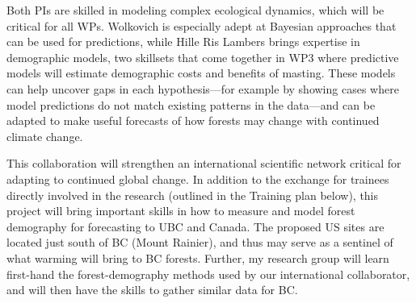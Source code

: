 \documentclass[12pt,oneside]{article}
\begin{document}
Both PIs are skilled in modeling complex ecological dynamics, which will be critical for all WPs. Wolkovich is especially adept at Bayesian approaches that can be used for predictions,\cite{ospreebbms,dan2021je,decsens,morales2024phylogenetic} while Hille Ris Lambers brings expertise in demographic models,\cite{hille2002density,clark2003estimating,ford2020soil} two skillsets that come together in WP3 where predictive models will estimate demographic costs and benefits of masting. These models can help uncover gaps in each hypothesis---for example by showing cases where model predictions do not match existing patterns in the data---and can be adapted to make useful forecasts of how forests may change with continued climate change.\cite{IPCC:2014sm} %

This collaboration will strengthen an international scientific network critical for adapting to continued global change. In addition to the exchange for trainees directly involved in the research (outlined in the Training plan below), this project will bring important skills in how to measure and model forest demography for forecasting to UBC and Canada. The proposed US sites are located just south of BC (Mount Rainier), and thus may serve as a sentinel of what warming will bring to BC forests. Further, my research group will learn first-hand the forest-demography methods used by our international collaborator, and will then have the skills to gather similar data for BC. %
\end{document}
